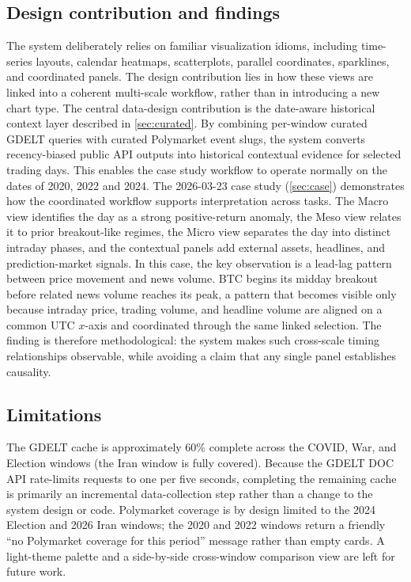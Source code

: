 \documentclass[journal,hideappendix]{vgtc}      %
\begin{document}
\subsection{Design contribution and findings}

The system deliberately relies on familiar visualization idioms, including time-series layouts, calendar heatmaps, scatterplots, parallel coordinates, sparklines, and coordinated panels. The design contribution lies in how these views are linked into a coherent multi-scale workflow, rather than in introducing a new chart type. 
The central data-design contribution is the date-aware historical context layer described in \cref{sec:curated}. 
By combining per-window curated GDELT queries with curated Polymarket event slugs, the system converts recency-biased public API outputs into historical contextual evidence for selected trading days. This enables the case study workflow to operate normally on the dates of 2020, 2022 and 2024.
The 2026-03-23 case study (\cref{sec:case}) demonstrates how the coordinated workflow supports interpretation across tasks. 
The Macro view identifies the day as a strong positive-return anomaly, the Meso view relates it to prior breakout-like regimes, the Micro view separates the day into distinct intraday phases, and the contextual panels add external assets, headlines, and prediction-market signals. 
In this case, the key observation is a lead-lag pattern between price movement and news volume. 
BTC begins its midday breakout before related news volume reaches its peak, a pattern that becomes visible only because intraday price, trading volume, and headline volume are aligned on a common UTC \(x\)-axis and coordinated through the same linked selection.
The finding is therefore methodological: the system makes such cross-scale timing relationships observable, while avoiding a claim that any single panel establishes causality.

\subsection{Limitations}

The GDELT cache is approximately \(60\%\)  complete across the COVID,
War, and Election windows (the Iran window is fully covered).  
Because the GDELT DOC API rate-limits requests to one per five seconds, completing the remaining cache is primarily an incremental data-collection step rather than a change to the system design or code. 
Polymarket coverage is by design limited to the 2024 Election and 2026 Iran windows; the 2020 and 2022 windows return a friendly ``no Polymarket coverage for this period'' message rather than empty cards.  
A light-theme palette and a side-by-side cross-window comparison view are left for future work.
\end{document}
